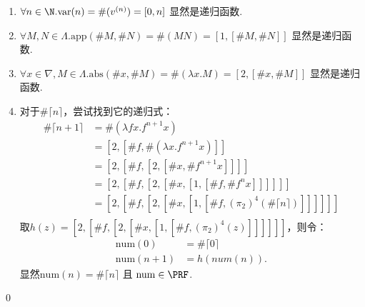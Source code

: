 \begin{pf} \rm \;
\begin{enumerate}
    \item $\forall n\in\N. \mathrm{var}(n)=\#(v^{(n)}) = [0, n]$ 显然是递归函数.
    \item $\forall M,N\in\Lambda. \mathrm{app}(\#M, \#N)=\#(M N) = [1, [\#M, \#N]]$ 显然是递归函数.
    \item $\forall x\in\nabla, M\in\Lambda.\mathrm{abs}(\#x, \#M) = \#(\lambda x.M) = [2,[\#x, \#M]]$ 显然是递归函数.
    \item 对于$\#\lceil n\rceil$，尝试找到它的递归式：
    $$
    \begin{aligned}
        \#\lceil n+1 \rceil 
        &= \#(\lambda fx.f^{n+1}x) \\
        &= [2, [\#f, \#(\lambda x.f^{n+1} x)]] \\
        &= [2, [\#f, [2, [\#x, \# f^{n+1} x]]]] \\
        &= [2, [\#f, [2, [\#x, [1, [\#f, \#f^nx]]]]]] \\
        &= [2, [\#f, [2, [\#x, [1, [\#f, (\pi_2)^4(\#\lceil n \rceil)]]]]]] \\
    \end{aligned}
    $$
    取$h(z) = [2, [\#f, [2, [\#x, [1, [\#f, (\pi_2)^4(z)]]]]]]$，则令：
    $$
    \begin{aligned}
        \mathrm{num}(0) &= \#\lceil 0 \rceil \\
        \mathrm{num}(n+1) &= h(num(n)).
    \end{aligned}
    $$
    显然$\mathrm{num}(n) = \#\lceil n \rceil$ 且 $\mathrm{num}\in\PRF$.
\end{enumerate}
    \qed
\end{pf}